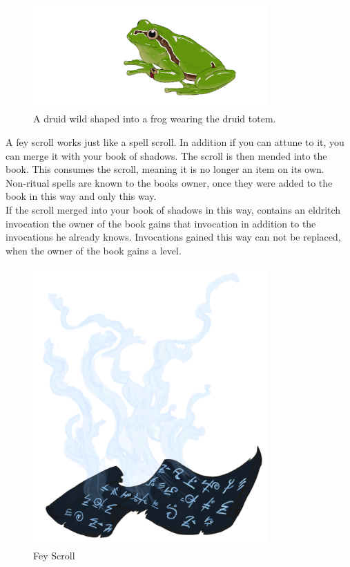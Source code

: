 \documentclass[letter,10pt,twocolumn,openany]{dndbook}
\begin{document}
\begin{figure}
    \includegraphics[width=9cm]{images/frog.png}
    \caption{A druid wild shaped into a frog wearing the druid totem.}
\end{figure}


A fey scroll works just like a spell scroll. In addition if you can attune to it, you can merge it with your book of shadows. The scroll is then mended into the book. This consumes the scroll, meaning it is no longer an item on its own.\\
Non-ritual spells are known to the books owner, once they were added to the book in this way and only this way.\\
If the scroll merged into your book of shadows in this way, contains an eldritch invocation the owner of the book gains that invocation in addition to the invocations he already knows. Invocations gained this way can not be replaced, when the owner of the book gains a level.

\begin{figure}
    \includegraphics[width=9cm]{images/fey_scroll.png}
    \caption{Fey Scroll}
\end{figure}
\end{document}
